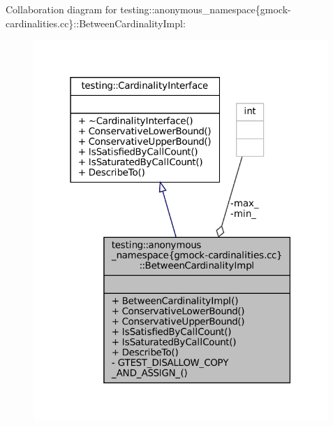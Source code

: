 Collaboration diagram for testing\+:\+:anonymous\+\_\+namespace\{gmock-\/cardinalities.cc\}\+:\+:Between\+Cardinality\+Impl\+:
\nopagebreak
\begin{figure}[H]
\begin{center}
\leavevmode
\includegraphics[width=316pt]{classtesting_1_1anonymous__namespace_02gmock-cardinalities_8cc_03_1_1BetweenCardinalityImpl__coll__graph}
\end{center}
\end{figure}
